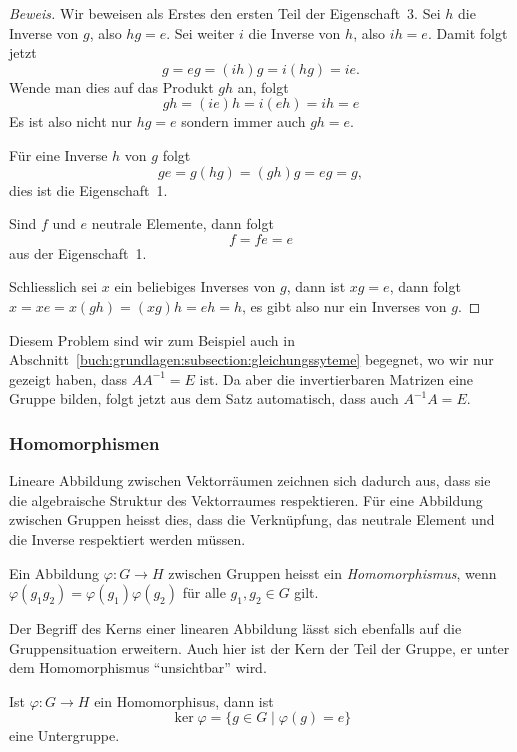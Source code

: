 \begin{proof}[Beweis]
Wir beweisen als Erstes den ersten Teil der Eigenschaft~3.
Sei $h$ die Inverse von $g$, also $hg=e$.
Sei weiter $i$ die Inverse von $h$, also $ih=e$.
Damit folgt jetzt
\[
g
=
eg
=
(ih)g
=
i(hg)
=
ie.
\]
Wende man dies auf das Produkt $gh$ an, folgt
\[
gh
=
(ie)h
=
i(eh)
=
ih
=
e
\]
Es ist also nicht nur $hg=e$ sondern immer auch $gh=e$.

Für eine Inverse $h$ von $g$ folgt
\[
ge
=
g(hg)
=
(gh)g
=
eg
=
g,
\]
dies ist die Eigenschaft~1.

Sind $f$ und $e$ neutrale Elemente, dann folgt
\[
f = fe = e
\]
aus der Eigenschaft~1.

Schliesslich sei $x$ ein beliebiges Inverses von $g$, dann ist
$xg=e$, dann folgt
$x=xe=x(gh)=(xg)h = eh = h$, es gibt also nur ein Inverses von $g$.
\end{proof}

Diesem Problem sind wir zum Beispiel auch in
Abschnitt~\ref{buch:grundlagen:subsection:gleichungssyteme}
begegnet, wo wir nur gezeigt haben, dass $AA^{-1}=E$ ist.
Da aber die invertierbaren Matrizen eine Gruppe
bilden, folgt jetzt aus dem Satz automatisch, dass auch $A^{-1}A=E$.

\subsubsection{Homomorphismen}
Lineare Abbildung zwischen Vektorräumen zeichnen sich dadurch aus,
dass sie die algebraische Struktur des Vektorraumes respektieren.
Für eine Abbildung zwischen Gruppen heisst dies, dass die Verknüpfung,
das neutrale Element und die Inverse respektiert werden müssen.

\begin{definition}
Ein Abbildung $\varphi\colon G\to H$ zwischen Gruppen heisst ein
{\em Homomorphismus}, wenn 
$\varphi(g_1g_2)=\varphi(g_1)\varphi(g_2)$ für alle $g_1,g_2\in G$ gilt.
%
\end{definition}

Der Begriff des Kerns einer linearen Abbildung lässt sich ebenfalls auf
die Gruppensituation erweitern.
Auch hier ist der Kern der Teil der Gruppe, er unter dem 
Homomorphismus ``unsichtbar'' wird.

\begin{definition}
Ist $\varphi\colon G\to H$ ein Homomorphisus, dann ist
\[
\ker\varphi
=
\{g\in G\;|\; \varphi(g)=e\}
\]
eine Untergruppe.
%
\end{definition}

